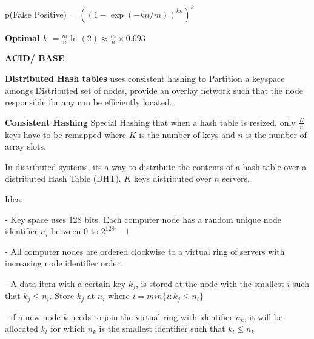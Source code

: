 \documentclass[a4paper,12pt]{article}
\begin{document}
p(False Positive) = $((1 - \exp(-kn/m))^{kn})^k$

\textbf{Optimal $k$} $= \frac{m}{n} \ln{(2)} \approx \frac{m}{n} \times  0.693$

\textbf{ACID/ BASE}

\clearpage
\textbf{Distributed Hash tables} uses consistent hashing to Partition a keyspace amongs
Distributed set of nodes, provide an overlay network such that the node responsible for any
can be efficiently located.

\bigskip
\textbf{Consistent Hashing} Special Hashing that when a hash table is resized, only
$\frac{K}{n}$ keys have to be remapped where $K$ is the number of keys and $n$ is the
number of array slots.

\bigskip
In distributed systems, its a way to distribute the contents of a hash table over a distributed
Hash Table (DHT). $K$ keys distributed over $n$ servers.

\bigskip
Idea:

- Key space uses 128 bits. Each computer node has a random unique node identifier
$n_i$ between $0$ to $2^{128}-1$

- All computer nodes are ordered clockwise to a virtual ring of servers with increasing node
identifier order.

- A data item with a certain key $k_j$, is stored at the node with the smallest $i$ such that
$k_j \leq n_i$. Store $k_j$ at $n_i$ where $i = min \{i : k_j \leq n_i\}$

- if a new node $k$ needs to join the virtual ring with identifier $n_k$, it will be allocated
$k_l$ for which $n_k$ is the smallest identifier such that $k_l \leq n_k$
\end{document}
